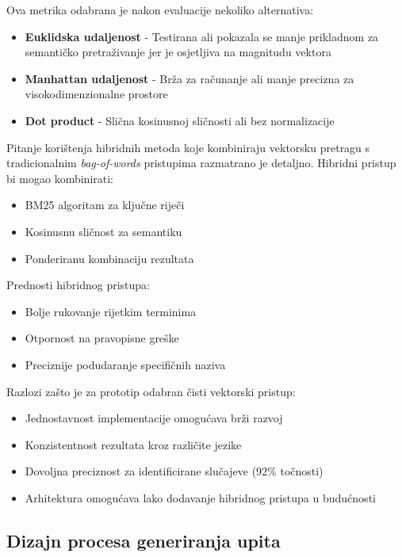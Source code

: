 Ova metrika odabrana je nakon evaluacije nekoliko alternativa:

\begin{itemize}
    \item \textbf{Euklidska udaljenost} - Testirana ali pokazala se manje prikladnom za semantičko pretraživanje jer je osjetljiva na magnitudu vektora
    \item \textbf{Manhattan udaljenost} - Brža za računanje ali manje precizna za visokodimenzionalne prostore
    \item \textbf{Dot product} - Slična kosinusnoj sličnosti ali bez normalizacije
\end{itemize}

Pitanje korištenja hibridnih metoda koje kombiniraju vektorsku pretragu s tradicionalnim \textit{bag-of-words} pristupima razmatrano je detaljno. Hibridni pristup bi mogao kombinirati:

\begin{itemize}
    \item BM25 algoritam za ključne riječi
    \item Kosinusnu sličnost za semantiku
    \item Ponderiranu kombinaciju rezultata
\end{itemize}

Prednosti hibridnog pristupa:
\begin{itemize}
    \item Bolje rukovanje rijetkim terminima
    \item Otpornost na pravopisne greške
    \item Preciznije podudaranje specifičnih naziva
\end{itemize}

Razlozi zašto je za prototip odabran čisti vektorski pristup:
\begin{itemize}
    \item Jednostavnost implementacije omogućava brži razvoj
    \item Konzistentnost rezultata kroz različite jezike
    \item Dovoljna preciznost za identificirane slučajeve (92\% točnosti)
    \item Arhitektura omogućava lako dodavanje hibridnog pristupa u budućnosti
\end{itemize}

\subsection{Dizajn procesa generiranja upita}

